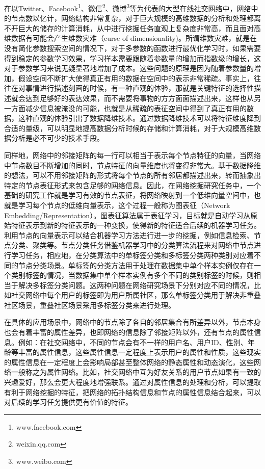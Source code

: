 在以Twitter、Facebook\footnote{www.facebook.com}、微信\footnote{weixin.qq.com}、微博\footnote{www.weibo.com}等为代表的大型在线社交网络中，网络中的节点数以亿计，网络结构非常复杂，对于巨大规模的高维数据的分析和处理都离不开巨大的储存的计算消耗，从中进行挖掘任务直观上复杂度非常高，而且面对高维数据有可能会产生维数灾难\cite{bellman2015adaptive}（curse of dimensionality)。所谓维数灾难，就是在没有简化参数搜索空间的情况下，对于多参数的函数进行最优化学习时，如果需要得到稳定的参数学习效果，学习样本需要跟随着参数量的增加而指数级的增长，这对于参数学习来说无疑显著地增加了成本。这些问题的原理是因为随着参数量的增加，假设空间不断扩大使得真正有用的数据在空间中的表示非常稀疏。事实上，往往在对事情进行描述刻画的时候，有一种直观的体验，那就是关键特征的选择性描述就会达到足够好的表达效果，而不需要将事物的方方面面描述出来，这样也从另一方面减少信息被淹没的可能，也就是从稀疏的表征空间中得到了真正有用的数据，这种直观的体验引出了数据降维技术。通过数据降维技术可以将特征维度降到合适的量级，可以明显地提高数据分析时候的存储和计算消耗，对于大规模高维数据分析是必不可少的技术手段。

同样地，网络中的邻接矩阵的每一行可以相当于表示每个节点特征的向量，当网络中节点数目不断增加的同时，节点特征的向量维度也将变得非常大。基于数据降维的想法，可以不用邻接矩阵的形式将每个节点的所有邻居都描述出来，转而抽象出特定的节点表征形式来包含足够的网络信息。因此，在网络挖掘研究任务中，一个基础的研究工作就是学习有效的节点表征，将网络映射到一个低维向量空间中\cite{chang2015heterogeneous}，也就是学习每个节点的低维向量表示，这个过程一般称为图表征（Network Embedding/Representation）。图表征算法属于表征学习，目标就是自动学习从原始特征表示到新的特征表示的一种变换，使得新的特征适合后续的机器学习任务。利用节点的向量表示可以结合机器学习方法进行进一步的挖掘，例如信息检索\cite{weiss2009spectral}、节点分类\cite{krizhevsky2012imagenet}、聚类\cite{ng2002spectral}等。节点分类任务借鉴机器学习中的分类算法流程来对网络中节点进行学习任务，相应地，在分类算法中的单标签分类和多标签分类两种类别对应着不同的节点分类场景。单标签的分类方法用于处理在数据集中单个样本实例仅存在一个类别标签的情况，当数据集中单个样本实例有多个不同的类别标签的时候，则相当于解决多标签分类问题。这两种问题在网络研究场景下分别对应不同的情况，比如社交网络中每个用户的标签即为用户所属社区，那么单标签分类用于解决非重叠社区场景，重叠社区场景采用多标签分类来进行处理。

在具体的应用场景中，网络中的节点除了各自的邻居集合有所差异以外，节点本身也会有着丰富的属性差异，也即网络的信息除了邻接矩阵以外，还有节点的属性信息。例如：在社交网络中，不同的节点会有不一样的用户名、用户ID、性别、年龄等丰富的属性信息，这些属性信息一定程度上表示用户的属性和性质，这些现实的属性信息在一定程度上会影响局部甚至整体网络的静态属性和动态演化，这些网络一般称之为属性网络。比如，社交网络中互为好友关系的用户节点如果有一致的兴趣爱好，那么会更大程度地增强联系。通过对属性信息的处理和分析，可以提取有利于网络挖掘的特征，把网络的拓扑结构信息和节点的属性信息结合起来，可以对后续的学习任务提供更有价值的特征。

